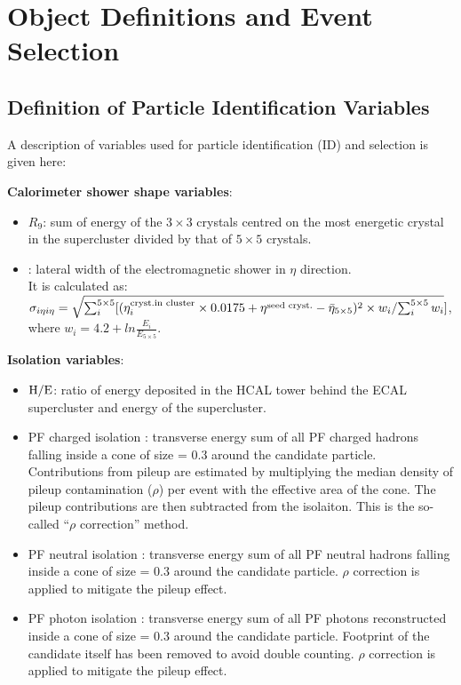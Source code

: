 \documentclass[thesis.tex]{subfiles}
\renewcommand\_{\textunderscore\allowbreak}
\begin{document}
\chapter{Object Definitions and Event Selection}
\label{cap:eventSelection}

\section{Definition of Particle Identification Variables}
A description of variables used for particle identification (ID) and selection is given here:

\noindent \textbf{Calorimeter shower shape variables}:
\begin{itemize}
	\item $R_9$: sum of energy of the $3\times3$ crystals centred on the most energetic crystal in the supercluster divided by that of $5\times5$ crystals. 
	\item \Sigmaieie: lateral width of the electromagnetic shower in $\eta$ direction. \\
		It is calculated as: $\sigma_{i\eta i\eta} = \sqrt{\sum_i^{5\times5}[(\eta_i^{\text{cryst.in cluster}}\times 0.0175 + \eta^{\text{seed cryst.}} - \bar{\eta}_{5\times5})^2 \times w_i/{\sum_i^{5\times5}w_i}}]$, where $w_i = 4.2+ln\frac{E_i}{E_{5\times5}}$.
\end{itemize}
\noindent \textbf{Isolation variables}:
\begin{itemize}
	\item $\mathrm{H/E}$: ratio of energy deposited in the HCAL tower behind the ECAL supercluster and energy of the supercluster.
	\item PF charged isolation \ChIso: transverse energy sum of all PF charged hadrons falling inside a cone of size \DeltaR = 0.3 around the candidate particle. Contributions from pileup are estimated by multiplying the median density of pileup contamination ($\rho$) per event with the effective area of the cone. The pileup contributions are then subtracted from the isolaiton. This is the so-called ``$\rho$ correction'' method. 
	\item PF neutral isolation \NeuIso:  transverse energy sum of all PF neutral hadrons falling inside a cone of size \DeltaR = 0.3 around the candidate particle. $\rho$ correction is applied to mitigate the pileup effect. 
	\item PF photon isolation \PhoIso: transverse energy sum of all PF photons reconstructed inside a cone of size \DeltaR = 0.3 around the candidate particle. Footprint of the candidate itself has been removed to avoid double counting. $\rho$ correction is applied to mitigate the pileup effect.
\end{itemize}
\end{document}
